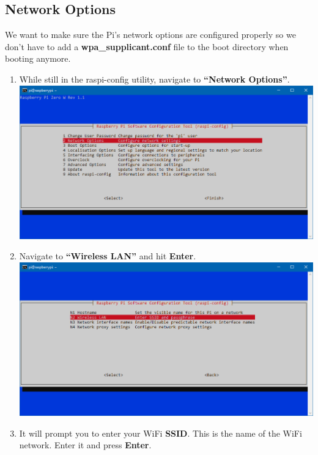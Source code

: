 \documentclass{article}
\begin{document}
\subsection{Network Options}

We want to make sure the Pi's network options are configured properly so we don't have to add a \textbf{wpa\_supplicant.conf} file to the boot directory when booting anymore.

\begin{enumerate}
  \item While still in the raspi-config utility, navigate to \textbf{``Network Options''}.
  \newline
  \newline
  \includegraphics[width=1.00\textwidth]{rcnet}
  \item Navigate to \textbf{``Wireless LAN''} and hit \textbf{Enter}.
  \newline
  \newline
  \includegraphics[width=1.00\textwidth]{rcnetwlan}
  \item It will prompt you to enter your WiFi \textbf{SSID}. This is the name of the WiFi network. Enter it and press \textbf{Enter}.
  \newline

\end{enumerate}
\end{document}
